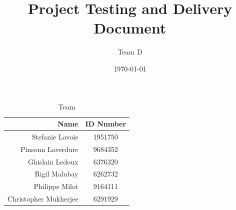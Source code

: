 \documentclass{article}
\begin{document}
\title{Project Testing and Delivery Document}
\author{Team D}
\date{\today}

\maketitle

\vspace*{3.5in}
\begin{table}[htbp]
\caption{Team}
\begin{center}
\begin{tabular}{|r | c|}
\hline
Name & ID Number \\
\hline\hline
Stefanie Lavoie & 1951750 \\
Pinsonn Laverdure & 9684352 \\
Ghislain Ledoux & 6376320 \\
Rigil Malubay & 6262732 \\
Philippe Milot & 9164111 \\
Christopher Mukherjee & 6291929 \\
\hline
\end{tabular}
\end{center}
\end{table}

\clearpage
\end{document}

